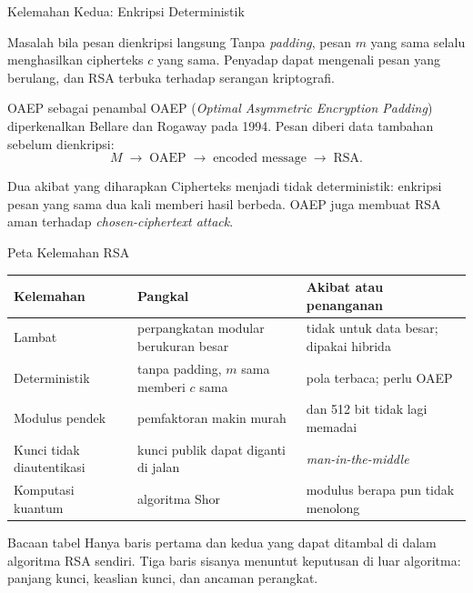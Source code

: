 \documentclass[aspectratio=169,11pt]{beamer}
\begin{document}
\begin{frame}{Kelemahan Kedua: Enkripsi Deterministik}
    \footnotesize
    \begin{alertblock}{Masalah bila pesan dienkripsi langsung}
        Tanpa \textit{padding}, pesan $m$ yang sama selalu menghasilkan
        cipherteks $c$ yang sama. Penyadap dapat mengenali pesan yang
        berulang, dan RSA terbuka terhadap serangan kriptografi.
    \end{alertblock}
    \begin{block}{OAEP sebagai penambal}
        OAEP (\textit{Optimal Asymmetric Encryption Padding}) diperkenalkan
        Bellare dan Rogaway pada 1994. Pesan diberi data tambahan sebelum
        dienkripsi:
        \[
            M \;\rightarrow\; \text{OAEP} \;\rightarrow\;
            \text{encoded message} \;\rightarrow\; \text{RSA}.
        \]
    \end{block}
    \begin{exampleblock}{Dua akibat yang diharapkan}
        \footnotesize
        Cipherteks menjadi tidak deterministik: enkripsi pesan yang sama dua
        kali memberi hasil berbeda. OAEP juga membuat RSA aman terhadap
        \textit{chosen-ciphertext attack}.
    \end{exampleblock}
\end{frame}

\begin{frame}{Peta Kelemahan RSA}
    \footnotesize
    \begin{tabularx}{\linewidth}{@{}>{\raggedright\arraybackslash}p{2.6cm}
                                    >{\raggedright\arraybackslash}X
                                    >{\raggedright\arraybackslash}X@{}}
        \toprule
        \textbf{Kelemahan} & \textbf{Pangkal} & \textbf{Akibat atau penanganan} \\
        \midrule
        Lambat & perpangkatan modular berukuran besar &
            tidak untuk data besar; dipakai hibrida \\
        \hline
        Deterministik & tanpa padding, $m$ sama memberi $c$ sama &
            pola terbaca; perlu OAEP \\
        \hline
        Modulus pendek & pemfaktoran makin murah &
            256 dan 512 bit tidak lagi memadai \\
        \hline
        Kunci tidak diautentikasi & kunci publik dapat diganti di jalan &
            \textit{man-in-the-middle} \\
        \hline
        Komputasi kuantum & algoritma Shor &
            modulus berapa pun tidak menolong \\
        \bottomrule
    \end{tabularx}
    \vspace{0.1cm}
    \begin{block}{Bacaan tabel}
        \footnotesize
        Hanya baris pertama dan kedua yang dapat ditambal di dalam algoritma
        RSA sendiri. Tiga baris sisanya menuntut keputusan di luar
        algoritma: panjang kunci, keaslian kunci, dan ancaman perangkat.
    \end{block}
\end{frame}
\end{document}
